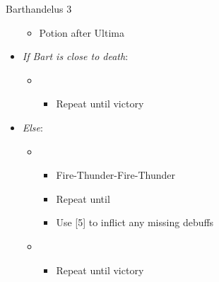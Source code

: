 \begin{battle}{Barthandelus 3}
\begin{multicols}{2}
\begin{itemize}
\begin{itemize}
				      \item Potion after Ultima
			      \end{itemize}
			\item \textit{If Bart is close to death}:
			      \begin{itemize}
				      \item \first
				            \begin{itemize}
					            \item Repeat until victory
				            \end{itemize}
			      \end{itemize}
			\item \textit{Else}:
			      \begin{itemize}
				      \item \sixth
				            \begin{itemize}
					            \item Fire-Thunder-Fire-Thunder
					            \item Repeat until \stagger
					            \item Use [5] to inflict any missing debuffs
				            \end{itemize}
				      \item \first
				            \begin{itemize}
					            \item Repeat until victory
				            \end{itemize}
			      \end{itemize}
		\end{itemize}
	\end{multicols}
\end{battle}
